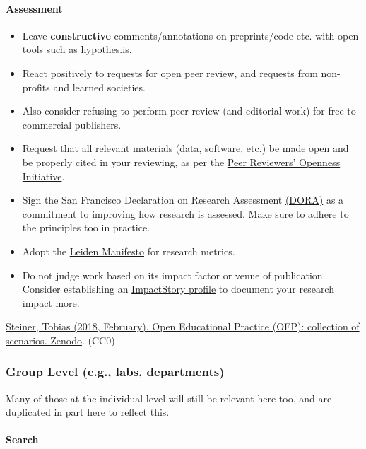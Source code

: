 \paragraph{Assessment}\label{assessment}

\begin{itemize}
\item
  Leave \textbf{constructive} comments/annotations on preprints/code
  etc. with open tools such as
  \href{https://web.hypothes.is/}{hypothes.is}.
\item
  React positively to requests for open peer review, and requests from
  non-profits and learned societies.
\item
  Also consider refusing to perform peer review (and editorial work) for
  free to commercial publishers.
\item
  Request that all relevant materials (data, software, etc.) be made
  open and be properly cited in your reviewing, as per the
  \href{https://opennessinitiative.org/}{Peer Reviewers' Openness
  Initiative}.
\item
  Sign the San Francisco Declaration on Research Assessment
  \href{https://sfdora.org/}{(DORA)} as a commitment to improving how
  research is assessed. Make sure to adhere to the principles too in
  practice.
\item
  Adopt the \href{http://www.leidenmanifesto.org/}{Leiden Manifesto} for
  research metrics.
\item
  Do not judge work based on its impact factor or venue of publication.
  Consider establishing an \href{http://impactstory.org/}{ImpactStory
  profile} to document your research impact more.
\end{itemize}

\href{https://zenodo.org/record/1183805}{Steiner, Tobias (2018,
February). Open Educational Practice (OEP): collection of scenarios.
Zenodo}. (CC0)

\subsubsection{Group Level (e.g., labs,
departments)}\label{group-level-e.g.-labs-departments}

Many of those at the individual level will still be relevant here too,
and are duplicated in part here to reflect this.

\paragraph{Search}\label{search-1}

